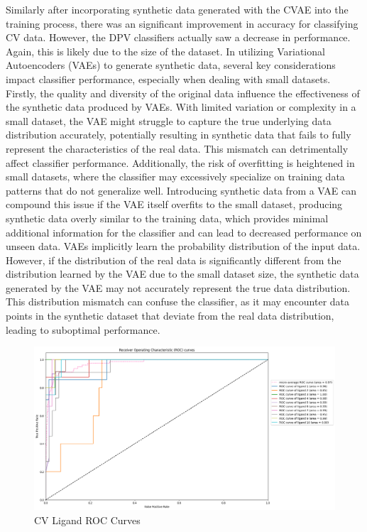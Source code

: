 Similarly after incorporating synthetic data generated with the CVAE into the training process, there was an significant improvement in accuracy for classifying CV data. However, the DPV classifiers actually saw a decrease in performance. Again, this is likely due to the size of the dataset. In utilizing Variational Autoencoders (VAEs) to generate synthetic data, several key considerations impact classifier performance, especially when dealing with small datasets. Firstly, the quality and diversity of the original data influence the effectiveness of the synthetic data produced by VAEs. With limited variation or complexity in a small dataset, the VAE might struggle to capture the true underlying data distribution accurately, potentially resulting in synthetic data that fails to fully represent the characteristics of the real data. This mismatch can detrimentally affect classifier performance. Additionally, the risk of overfitting is heightened in small datasets, where the classifier may excessively specialize on training data patterns that do not generalize well. Introducing synthetic data from a VAE can compound this issue if the VAE itself overfits to the small dataset, producing synthetic data overly similar to the training data, which provides minimal additional information for the classifier and can lead to decreased performance on unseen data. VAEs implicitly learn the probability distribution of the input data. However, if the distribution of the real data is significantly different from the distribution learned by the VAE due to the small dataset size, the synthetic data generated by the VAE may not accurately represent the true data distribution. This distribution mismatch can confuse the classifier, as it may encounter data points in the synthetic dataset that deviate from the real data distribution, leading to suboptimal performance.
\begin{figure}[h!]
  \centering
    \includegraphics[width=1.0\textwidth]{figures/ligand_roc.png}
    \caption{CV Ligand ROC Curves}
    \label{ligand_roc}
\end{figure}
